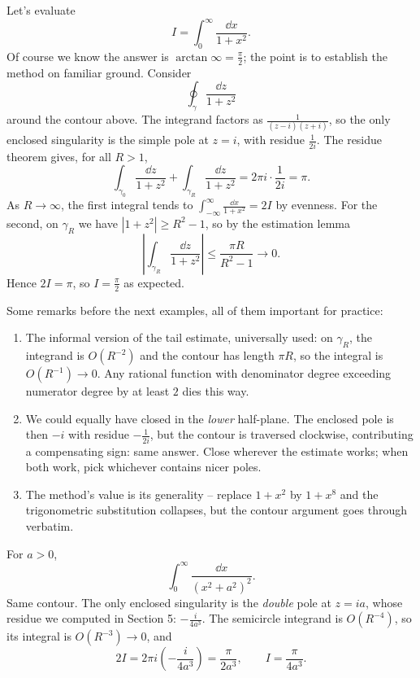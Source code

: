 \begin{example}
	Let's evaluate
	$$
	I = \int_0^\infty \frac{\dd x}{1 + x^2}.
	$$
	Of course we know the answer is $\arctan \infty = \frac{\pi}{2}$; the point is to establish the method on familiar ground. Consider
	$$
	\oint_\gamma \frac{\dd z}{1 + z^2}
	$$
	around the contour above. The integrand factors as $\frac{1}{(z-i)(z+i)}$, so the only enclosed singularity is the simple pole at $z = i$, with residue $\frac{1}{2i}$. The residue theorem gives, for all $R > 1$,
	$$
	\int_{\gamma_0} \frac{\dd z}{1 + z^2} + \int_{\gamma_R} \frac{\dd z}{1 + z^2} = 2\pi i \cdot \frac{1}{2i} = \pi.
	$$
	As $R \to \infty$, the first integral tends to $\int_{-\infty}^\infty \frac{\dd x}{1 + x^2} = 2I$ by evenness. For the second, on $\gamma_R$ we have $|1 + z^2| \geq R^2 - 1$, so by the estimation lemma
	$$
	\left|\int_{\gamma_R} \frac{\dd z}{1 + z^2}\right| \leq \frac{\pi R}{R^2 - 1} \to 0.
	$$
	Hence $2I = \pi$, so $I = \frac{\pi}{2}$ as expected.
\end{example}

Some remarks before the next examples, all of them important for practice:
\begin{enumerate}[label=(\roman*)]
	\item The informal version of the tail estimate, universally used: on $\gamma_R$, the integrand is $O(R^{-2})$ and the contour has length $\pi R$, so the integral is $O(R^{-1}) \to 0$. Any rational function with denominator degree exceeding numerator degree by at least $2$ dies this way.
	\item We could equally have closed in the \emph{lower} half-plane. The enclosed pole is then $-i$ with residue $-\frac{1}{2i}$, but the contour is traversed clockwise, contributing a compensating sign: same answer. Close wherever the estimate works; when both work, pick whichever contains nicer poles.
	\item The method's value is its generality -- replace $1 + x^2$ by $1 + x^8$ and the trigonometric substitution collapses, but the contour argument goes through verbatim.
\end{enumerate}

\begin{example}
	For $a > 0$,
	$$
	\int_0^\infty \frac{\dd x}{(x^2 + a^2)^2}.
	$$
	Same contour. The only enclosed singularity is the \emph{double} pole at $z = ia$, whose residue we computed in Section 5: $-\frac{i}{4a^3}$. The semicircle integrand is $O(R^{-4})$, so its integral is $O(R^{-3}) \to 0$, and
	$$
	2I = 2\pi i \left(-\frac{i}{4 a^3}\right) = \frac{\pi}{2a^3}, \qquad I = \frac{\pi}{4a^3}.
	$$
\end{example}

